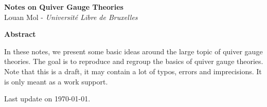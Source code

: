 \begin{titlepage}


	\begin{center}

	{\Huge{\bfseries{Notes on Quiver Gauge Theories}}}\\[0.7cm]

	Louan Mol - \textit{Université Libre de Bruxelles}

	\vspace{10cm}
	
	{\large\textbf{Abstract}}
	\end{center}
	
	    \quad In these notes, we present some basic ideas around the large topic of quiver gauge theories.  The goal is to reproduce and regroup the basics of quiver gauge theories. Note that this is a draft, it may contain a lot of typos, errors and imprecisions. It is only meant as a work support.
	    
	\vfill

	\hfill Last update on \today.
	
\end{titlepage}